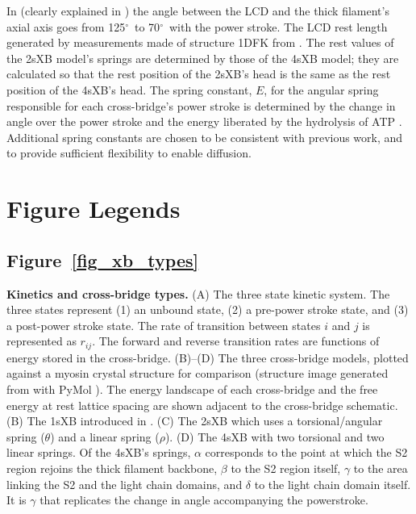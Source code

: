 \documentclass[11pt,titlepage]{article}
\newcommand{\de}{$^\circ$~} %
\begin{document}
\begin{table}[ht]
\begin{center}
{	    In \citet{Taylor1999} (clearly explained in \citet{Davis2009}) the angle between the LCD and the thick filament's axial axis goes from 125\de to 70\de with the power stroke. 
	    The LCD rest length generated by measurements made of structure 1DFK from \citet{Houdusse2000}. 
	    The rest values of the 2sXB model's springs are determined by those of the 4sXB model; they are calculated so that the rest position of the 2sXB's head is the same as the rest position of the 4sXB's head. 
	    The spring constant, $E$, for the angular spring responsible for each cross-bridge's power stroke is determined by the change in angle over the power stroke and the energy liberated by the hydrolysis of ATP \citep{Tanner2007}. 
	    Additional spring constants are chosen to be consistent with previous work, and to provide sufficient flexibility to enable diffusion. 
    }
    \end{center}
\end{table}



\clearpage
\section*{Figure Legends}

\subsection*{Figure~\ref{fig_xb_types}}
        \textbf{Kinetics and cross-bridge types.} 
        (A)  The three state kinetic system. 
        The three states represent (1) an unbound state, (2) a pre-power stroke state, and (3) a post-power stroke state. 
        The rate of transition between states $i$ and $j$ is represented as $r_{ij}$. 
        The forward and reverse transition rates are functions of energy stored in the cross-bridge. 
        (B)--(D) The three cross-bridge models, plotted against a myosin crystal structure for comparison (structure image generated from \protect\citet{Gourinath2003} with PyMol \protect\citep{pymol}).
        The energy landscape of each cross-bridge and the free energy at rest lattice spacing are shown adjacent to the cross-bridge schematic.
        (B) The 1sXB introduced in \protect\citep{Huxley1957}. 
        (C) The 2sXB which uses a torsional/angular spring ($\theta$) and a linear spring ($\rho$). 
        (D) The 4sXB with two torsional and two linear springs.
        Of the 4sXB's springs, $\alpha$ corresponds to the point at which the S2 region rejoins the thick filament backbone, $\beta$ to the S2 region itself, $\gamma$ to the area linking the S2 and the light chain domains, and $\delta$ to the light chain domain itself.
        It is $\gamma$ that replicates the change in angle accompanying the powerstroke. 
\end{document}
